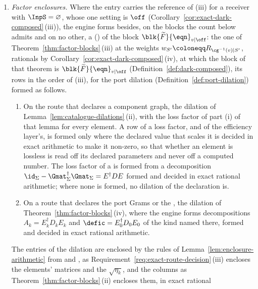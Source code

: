 \begin{requirement}
\begin{enumerate}[label=(\roman*),leftmargin=2.4em]
  (). Item (iv) binds
  as stated.
\item \emph{Factor enclosures.} Where the entry carries the reference of
  (iii) for a receiver with $\InpS=\varnothing$, whose one setting is $\off$
  (Corollary~\ref{cor:exact-dark-composed}\,(iii)), the engine forms
  besides, on the blocks the count below admits and on no other, a
   () of the
  block $\blk{\widetilde F}{\eqn}_{v|\off}$: the one of
  Theorem~\ref{thm:factor-blocks}\,(iii) at the weights
  $w_{S'}\coloneqq R_{\cg^{-1}(v)|S'}$, rationals by
  Corollary~\ref{cor:exact-dark-composed}\,(iv), at which the block of that
  theorem is $\blk{\widetilde F}{\eqn}_{v|\off}$
  (Definition~\ref{def:dark-composed}), its rows in the order of (iii), for
  the port dilation (Definition~\ref{def:port-dilation}) formed as follows.
  \begin{enumerate}[label=(\alph*),leftmargin=2.0em]
  \item On the route that declares a component graph, the dilation of
    Lemma~\ref{lem:catalogue-dilations}\,(ii), with the loss factor of
    part (i) of that lemma for every element. A row of a loss factor, and of
    the efficiency layer's, is formed only where the declared value that
    scales it is decided in exact arithmetic to make it non-zero, so that
    whether an element is lossless is read off its declared parameters and
    never off a computed number. The loss factor of a  is formed
    from a decomposition
    $\id_\Sigma-\Gmat_\Sigma^{\dagger}\Gmat_\Sigma=E^{\dagger}DE$ formed and
    decided in exact rational arithmetic; where none is formed, no dilation of
    the declaration is.
  \item On a route that declares the port Grams or the , the
    dilation of Theorem~\ref{thm:factor-blocks}\,(iv), where the engine forms
    decompositions $A_k=E_k^{\dagger}D_kE_k$ and $\defic=E_0^{\dagger}D_0E_0$
    of the kind named there, formed and decided in exact rational arithmetic.
  \end{enumerate}
  The entries of the dilation are enclosed by the rules of
  Lemma~\ref{lem:enclosure-arithmetic} from  and , as Requirement~\ref{req:exact-route-decision}\,(iii) encloses
  the elements' matrices and the $\sqrt{\eta_k}$, and the columns as
  Theorem~\ref{thm:factor-blocks}\,(ii) encloses them, in exact rational

\end{enumerate}
\end{requirement}
